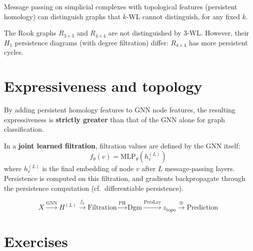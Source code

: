 \begin{theorem}
Message passing on simplicial complexes with topological features
(persistent homology) can distinguish graphs that $k$-WL cannot
distinguish, for any fixed $k$.
\end{theorem}

\begin{example}
The Rook graphs $R_{3 \times 3}$ and $R_{4 \times 4}$ are not
distinguished by $3$-WL. However, their $H_1$ persistence diagrams
(with degree filtration) differ: $R_{4 \times 4}$ has more
persistent cycles.
\end{example}

\section{Expressiveness and topology}
\label{sec:expressiveness}

\begin{proposition}
By adding persistent homology features to GNN node features, the
resulting expressiveness is \textbf{strictly greater} than that of
the GNN alone for graph classification.
\end{proposition}

\begin{definition}
In a \textbf{joint learned filtration}, filtration values are
defined by the GNN itself:
\[
  f_\theta(v) = \mathrm{MLP}_\theta(h_v^{(L)})
\]
where $h_v^{(L)}$ is the final embedding of node $v$ after $L$
message-passing layers. Persistence is computed on this filtration,
and gradients backpropagate through the persistence computation
(cf.\ differentiable persistence).
\end{definition}

\begin{keyformulas}[title=\textbf{GNN + TDA pipeline}]
\[
  X \xrightarrow{\text{GNN}} H^{(L)}
  \xrightarrow{f_\theta} \text{Filtration}
  \xrightarrow{\text{PH}} \mathrm{Dgm}
  \xrightarrow{\text{PersLay}} z_{\mathrm{topo}}
  \xrightarrow{\oplus} \text{Prediction}
\]
\end{keyformulas}

\section{Exercises}

